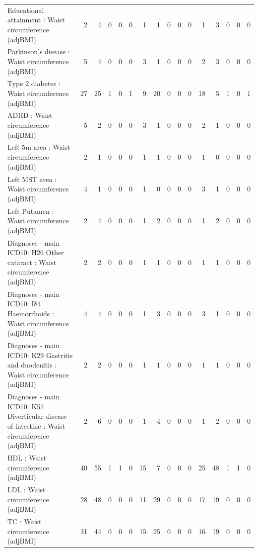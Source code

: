 \begin{table}[ht]
\begin{tabular}{lrrrrrrrrrrrrrrr}
  Educational attainment : Waist circumference (adjBMI) &   2 &   4 &   0 &   0 &   0 &   1 &   1 &   0 &   0 &   0 &   1 &   3 &   0 &   0 &   0 \\ 
  Parkinson's disease : Waist circumference (adjBMI) &   5 &   4 &   0 &   0 &   0 &   3 &   1 &   0 &   0 &   0 &   2 &   3 &   0 &   0 &   0 \\ 
  Type 2 diabetes : Waist circumference (adjBMI) &  27 &  25 &   1 &   0 &   1 &   9 &  20 &   0 &   0 &   0 &  18 &   5 &   1 &   0 &   1 \\ 
  ADHD : Waist circumference (adjBMI) &   5 &   2 &   0 &   0 &   0 &   3 &   1 &   0 &   0 &   0 &   2 &   1 &   0 &   0 &   0 \\ 
  Left 5m area : Waist circumference (adjBMI) &   2 &   1 &   0 &   0 &   0 &   1 &   1 &   0 &   0 &   0 &   1 &   0 &   0 &   0 &   0 \\ 
  Left MST area : Waist circumference (adjBMI) &   4 &   1 &   0 &   0 &   0 &   1 &   0 &   0 &   0 &   0 &   3 &   1 &   0 &   0 &   0 \\ 
  Left Putamen : Waist circumference (adjBMI) &   2 &   4 &   0 &   0 &   0 &   1 &   2 &   0 &   0 &   0 &   1 &   2 &   0 &   0 &   0 \\ 
  Diagnoses - main ICD10: H26 Other cataract : Waist circumference (adjBMI) &   2 &   2 &   0 &   0 &   0 &   1 &   1 &   0 &   0 &   0 &   1 &   1 &   0 &   0 &   0 \\ 
  Diagnoses - main ICD10: I84 Haemorrhoids : Waist circumference (adjBMI) &   4 &   4 &   0 &   0 &   0 &   1 &   3 &   0 &   0 &   0 &   3 &   1 &   0 &   0 &   0 \\ 
  Diagnoses - main ICD10: K29 Gastritis and duodenitis : Waist circumference (adjBMI) &   2 &   2 &   0 &   0 &   0 &   1 &   1 &   0 &   0 &   0 &   1 &   1 &   0 &   0 &   0 \\ 
  Diagnoses - main ICD10: K57 Diverticular disease of intestine : Waist circumference (adjBMI) &   2 &   6 &   0 &   0 &   0 &   1 &   4 &   0 &   0 &   0 &   1 &   2 &   0 &   0 &   0 \\ 
  HDL : Waist circumference (adjBMI) &  40 &  55 &   1 &   1 &   0 &  15 &   7 &   0 &   0 &   0 &  25 &  48 &   1 &   1 &   0 \\ 
  LDL : Waist circumference (adjBMI) &  28 &  48 &   0 &   0 &   0 &  11 &  29 &   0 &   0 &   0 &  17 &  19 &   0 &   0 &   0 \\ 
  TC : Waist circumference (adjBMI) &  31 &  44 &   0 &   0 &   0 &  15 &  25 &   0 &   0 &   0 &  16 &  19 &   0 &   0 &   0 \\ 

\end{tabular}
\end{table}
